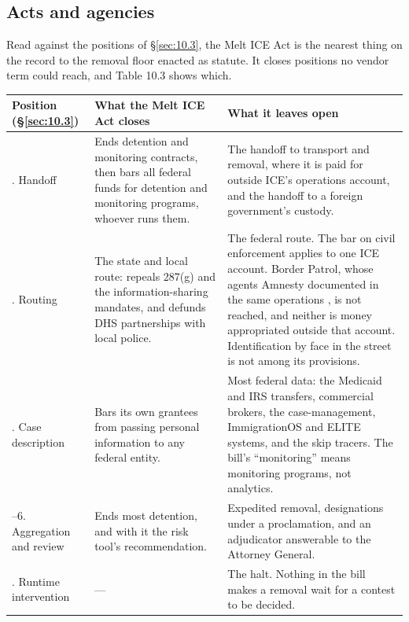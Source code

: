 \subsection{Acts and agencies}
\label{sec:10.4.2}
Read against the positions of \S\ref{sec:10.3}, the Melt ICE Act is the nearest thing on the record to the removal floor enacted as statute. It closes positions no vendor term could reach, and Table 10.3 shows which.


\begingroup\small\renewcommand{\arraystretch}{1.12}
\begin{longtable}{@{}>{\raggedright\arraybackslash}p{}>{\raggedright\arraybackslash}p{}>{\raggedright\arraybackslash}p{}@{}}
\hline
\textbf{Position (\S\ref{sec:10.3})} & \textbf{What the Melt ICE Act closes} & \textbf{What it leaves open} \\
\hline
\endhead
8. Handoff & Ends detention and monitoring contracts, then bars all federal funds for detention and monitoring programs, whoever runs them. & The handoff to transport and removal, where it is paid for outside ICE's operations account, and the handoff to a foreign government's custody. \\ \hline
2. Routing & The state and local route: repeals 287(g) and the information-sharing mandates, and defunds DHS partnerships with local police. & The federal route. The bar on civil enforcement applies to one ICE account. Border Patrol, whose agents Amnesty documented in the same operations \autocite{Amnesty2026Whistles}, is not reached, and neither is money appropriated outside that account. Identification by face in the street is not among its provisions. \\ \hline
3. Case description & Bars its own grantees from passing personal information to any federal entity. & Most federal data: the Medicaid and IRS transfers, commercial brokers, the case-management, ImmigrationOS and ELITE systems, and the skip tracers. The bill's “monitoring” means monitoring programs, not analytics. \\ \hline
5–6. Aggregation and review & Ends most detention, and with it the risk tool's recommendation. & Expedited removal, designations under a proclamation, and an adjudicator answerable to the Attorney General. \\ \hline
9. Runtime intervention & — & The halt. Nothing in the bill makes a removal wait for a contest to be decided. \\ \hline
\end{longtable}
\endgroup

